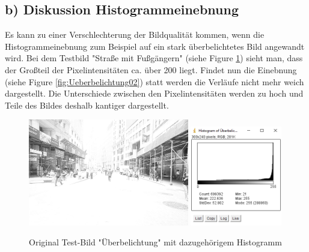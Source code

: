 \documentclass[12pt,german]{article}
\begin{document}
\pagebreak
\subsection {b) Diskussion Histogrammeinebnung}
Es kann zu einer Verschlechterung der Bildqualität kommen, wenn die Histogrammeinebnung zum Beispiel auf ein stark überbelichtetes Bild angewandt wird. Bei dem Testbild "Straße mit Fußgängern"  (siehe Figure \ref{fig:Ueberbelichtung01}) sieht man, dass der Großteil der Pixelintensitäten ca. über 200 liegt. Findet nun die Einebnung  (siehe Figure \ref{fig:Ueberbelichtung02}) statt werden die Verläufe nicht mehr weich dargestellt. Die Unterschiede zwischen den Pixelintensitäten werden zu hoch und Teile des Bildes deshalb kantiger dargestellt.
\begin{figure}[H] \centering
	\includegraphics[width=7cm]{../testData/Results/Ueberbelichtung/Ueberbelichtung.jpg}
	\includegraphics[width=4cm]{../testData/Results/Ueberbelichtung/Ueberbelichtung-histogram.png}
	\caption{Original Test-Bild "Überbelichtung" mit dazugehörigem Histogramm}
	\label{fig:Ueberbelichtung01}
\end{figure}
\end{document}
